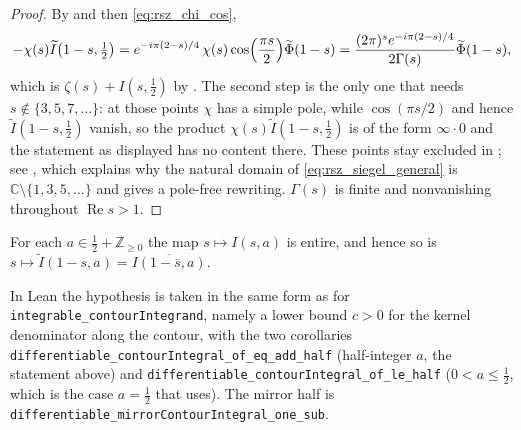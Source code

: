\begin{proof}
\leanok
By  and then \eqref{eq:rsz_chi_cos},
\[
  -\chi(s)\widetilde I\bigl(1-s,\tfrac12\bigr)
   =e^{-i\pi(2-s)/4}\,\chi(s)\cos\Bigl(\frac{\pi s}2\Bigr)\widetilde\Phi(1-s)
   =\frac{(2\pi)^{s}e^{-i\pi(2-s)/4}}{2\Gamma(s)}\widetilde\Phi(1-s),
\]
which is $\zeta(s)+I(s,\tfrac12)$ by .  The second step is the only one
that needs $s\notin\{3,5,7,\dots\}$: at those points $\chi$ has a simple pole, while
$\cos(\pi s/2)$ and hence $\widetilde I(1-s,\tfrac12)$ vanish, so the product
$\chi(s)\widetilde I(1-s,\tfrac12)$ is of the form $\infty\cdot0$ and the statement as
displayed has no content there.  These points stay excluded in ; see
, which explains why the natural domain of
\eqref{eq:rsz_siegel_general} is $\mathbb{C}\setminus\{1,3,5,\dots\}$ and gives a pole-free
rewriting.  $\Gamma(s)$ is finite and nonvanishing throughout $\operatorname{Re}s>1$.
\end{proof}

\begin{lemma}
\label{lem:rsz_entire}
\leanok
{}
For each $a\in\tfrac12+\mathbb{Z}_{\ge0}$ the map $s\mapsto I(s,a)$ is entire, and hence so
is $s\mapsto\widetilde I(1-s,a)=\overline{I(1-\overline s,a)}$.

In Lean the hypothesis is taken in the same form as for
\texttt{integrable\_contourIntegrand}, namely a lower bound $c>0$ for the kernel denominator
along the contour, with the two corollaries
\texttt{differentiable\_contourIntegral\_of\_eq\_add\_half} (half-integer $a$, the statement
above) and \texttt{differentiable\_contourIntegral\_of\_le\_half} ($0<a\le\tfrac12$, which is
the case $a=\tfrac12$ that  uses).  The mirror half is
\texttt{differentiable\_mirrorContourIntegral\_one\_sub}.
\end{lemma}

